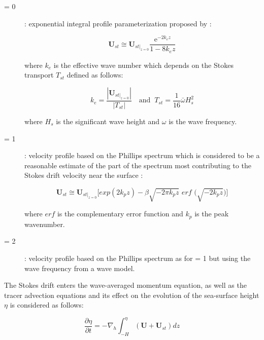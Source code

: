 \documentclass[../tex_main/NEMO_manual]{subfiles}
\begin{document}
\begin{description}
\item[ = 0]: exponential integral profile parameterization proposed by 
\citet{Breivik_al_JPO2014}:

\begin{equation} \label{eq:sbc_wave_sdw_0a}
\mathbf{U}_{st} \cong \mathbf{U}_{st |_{z=0}} \frac{\mathrm{e}^{-2k_ez}} {1-8k_ez} 
\end{equation}

where $k_e$ is the effective wave number which depends on the Stokes transport $T_{st}$ defined as follows:

\begin{equation} \label{eq:sbc_wave_sdw_0b}
k_e = \frac{|\mathbf{U}_{\left.st\right|_{z=0}}|} {|T_{st}|} 
\quad \text{and }\
T_{st} = \frac{1}{16} \bar{\omega} H_s^2 
\end{equation}

where $H_s$ is the significant wave height and $\omega$ is the wave frequency.

\item[ = 1]: velocity profile based on the Phillips spectrum which is considered to be a 
reasonable estimate of the part of the spectrum most contributing to the Stokes drift velocity near the surface
\citep{Breivik_al_OM2016}:

\begin{equation} \label{eq:sbc_wave_sdw_1}
\mathbf{U}_{st} \cong \mathbf{U}_{st |_{z=0}} \Big[exp(2k_pz)-\beta \sqrt{-2 \pi k_pz} 
\textit{ erf } \Big(\sqrt{-2 k_pz}\Big)\Big]
\end{equation}

where $erf$ is the complementary error function and $k_p$ is the peak wavenumber.

\item[ = 2]: velocity profile based on the Phillips spectrum as for  = 1 
but using the wave frequency from a wave model.

\end{description}

The Stokes drift enters the wave-averaged momentum equation, as well as the tracer advection equations 
and its effect on the evolution of the sea-surface height ${\eta}$ is considered as follows: 

\begin{equation} \label{eq:sbc_wave_eta_sdw}
\frac{\partial{\eta}}{\partial{t}} = 
-\nabla_h \int_{-H}^{\eta} (\mathbf{U} + \mathbf{U}_{st}) dz 
\end{equation}
\end{document}
